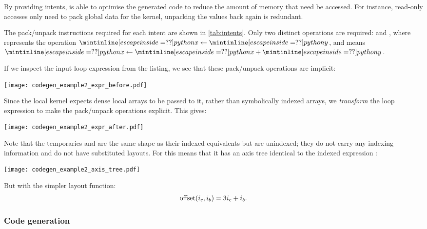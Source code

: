 \documentclass[thesis]{subfiles}
\begin{document}
By providing intents,  is able to optimise the generated code to reduce the amount of memory that need be accessed.
For instance, read-only accesses only need to pack global data for the kernel, unpacking the values back again is redundant.

The pack/unpack instructions required for each intent are shown in \cref{tab:intents}.
Only two distinct operations are required:  and , where  represents the operation $\pycode{x} \gets \pycode{y}$, and  means $\pycode{x} \gets \pycode{x} + \pycode{y}$.

If we inspect the input loop expression from the listing, we see that these pack/unpack operations are implicit:
\begin{center}
  \texttt{[image: codegen\_example2\_expr\_before.pdf]}
\end{center}
Since the local kernel expects dense local arrays to be passed to it, rather than symbolically indexed arrays, we \emph{transform} the loop expression to make the pack/unpack operations explicit.
This gives:
\begin{center}
  \texttt{[image: codegen\_example2\_expr\_after.pdf]}
\end{center}
Note that the temporaries  and  are the same shape as their indexed equivalents but are unindexed; they do not carry any indexing information and do not have substituted layouts.
For  this means that it has an axis tree identical to the indexed expression :
\begin{center}
  \texttt{[image: codegen\_example2\_axis\_tree.pdf]}
\end{center}
But with the simpler layout function:
\begin{equation}
  \textnormal{offset}(i_c, i_b) = 3 i_c + i_b.
  \label{eq:temporary_layout}
\end{equation}

\subsubsection{Code generation}
\end{document}
